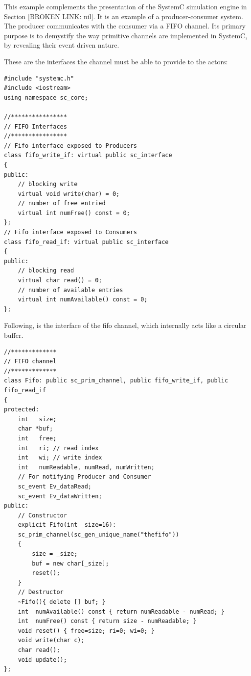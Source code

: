 \documentclass[11pt]{article}
\begin{document}
This example complements the presentation of the SystemC simulation engine in Section [BROKEN LINK: nil].
It is an example of a producer-consumer system.
The producer communicates with the consumer via a FIFO channel.
Its primary purpose is to demystify the way primitive channels are implemented in SystemC, by revealing their event driven nature.

These are the interfaces the channel must be able to provide to the actors: 
\begin{verbatim}
#include "systemc.h"
#include <iostream>
using namespace sc_core;

//****************
// FIFO Interfaces
//****************
// Fifo interface exposed to Producers
class fifo_write_if: virtual public sc_interface
{
public:
    // blocking write
    virtual void write(char) = 0;
    // number of free entried
    virtual int numFree() const = 0;
};
// Fifo interface exposed to Consumers
class fifo_read_if: virtual public sc_interface
{
public:
    // blocking read
    virtual char read() = 0;
    // number of available entries
    virtual int numAvailable() const = 0;
};
\end{verbatim}


Following, is the interface of the fifo channel, which internally acts like a circular buffer.
\begin{verbatim}
//*************
// FIFO channel
//*************
class Fifo: public sc_prim_channel, public fifo_write_if, public fifo_read_if
{
protected:
    int   size;
    char *buf;
    int   free;
    int   ri; // read index
    int   wi; // write index
    int   numReadable, numRead, numWritten;
    // For notifying Producer and Consumer
    sc_event Ev_dataRead;
    sc_event Ev_dataWritten;
public:
    // Constructor
    explicit Fifo(int _size=16):
	sc_prim_channel(sc_gen_unique_name("thefifo"))
	{
	    size = _size;
	    buf = new char[_size];
	    reset();
	}
    // Destructor
    ~Fifo(){ delete [] buf; }
    int  numAvailable() const { return numReadable - numRead; }
    int  numFree() const { return size - numReadable; }
    void reset() { free=size; ri=0; wi=0; }
    void write(char c);
    char read();
    void update();
};
\end{verbatim}
\end{document}
